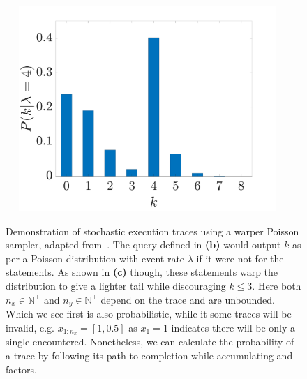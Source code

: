 \begin{figure}[p]
\begin{minipage}[b]{0.49\textwidth}
	\end{minipage}
	\begin{minipage}[b]{0.49\textwidth}
		\centering	~~
		\includegraphics[width=0.87\textwidth]{probprog/figures/poisson_plot.pdf}			
	\end{minipage}
	\vspace{5pt}
	\caption{Demonstration of stochastic execution traces using a warper
		Poisson sampler, adapted from~\cite[Figure 3.3]{paige2017thesis}.  The query defined in 
		\textbf{(b)} would output $k$ as per a Poisson
		distribution with event rate $\lambda$ if it were not for the \observe statements.
		As shown in \textbf{(c)} though, these \observe statements warp the distribution to
		give a lighter tail while discouraging $k\le3$.   Here both $n_x \in \mathbb{N}^+$ and
		$n_y \in \mathbb{N}^+$ depend on the trace and are unbounded.  Which
		\observe we see first is also probabilistic, while it some traces will be invalid, e.g. $x_{1:n_x}=[1,0.5]$
		as $x_1=1$ indicates there will be only a single \sample encountered.  Nonetheless, we can
		calculate the probability of a trace by following its path to completion while
		accumulating \sample and \observe factors.
		\label{fig:probprog:poisson}}
\end{figure}

